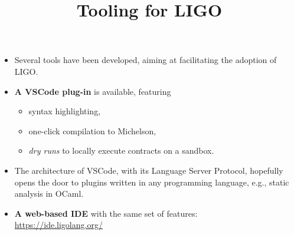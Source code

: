 \documentclass[wide]{slides}
\begin{document}
\begin{slide}
  \title{Tooling for LIGO}

  \begin{itemize}

    \item Several tools have been developed, aiming at facilitating
      the adoption of LIGO.

    \item \textbf{A VSCode plug-in} is available,
      featuring
      \begin{itemize}

        \item syntax highlighting,

        \item one-click compilation to Michelson,

        \item \emph{dry runs} to locally execute contracts on a
          sandbox.


      \end{itemize}

    \item The architecture of VSCode, with its Language Server
      Protocol, hopefully opens the door to plugins written in any
      programming language, e.g., static analysis in OCaml.

    \item \textbf{A web-based IDE} with the same set of features:\\
      \url{https://ide.ligolang.org/}


  \end{itemize}

\end{slide}
\end{document}
